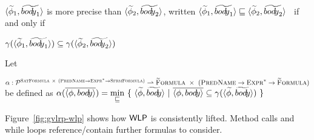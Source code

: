 \documentclass {llncs}
\begin{document}
\begin{definition}\label{def:precision-x}
    $\langle \widetilde{\phi}_1, \widetilde{bod{\!y}_1} \rangle$ is more precise than $\langle \widetilde{\phi}_2, \widetilde{bod{\!y}_2} \rangle$, written $\langle \widetilde{\phi}_1, \widetilde{bod{\!y}_1} \rangle \sqsubseteq \langle \widetilde{\phi}_2, \widetilde{bod{\!y}_2} \rangle$~ if and only if~ 
    
\noindent $\gamma(\langle \widetilde{\phi}_1, \widetilde{bod{\!y}_1} \rangle) \subseteq \gamma(\langle \widetilde{\phi}_2, \widetilde{bod{\!y}_2} \rangle)$
\end{definition}

\begin{definition}\label{def:abstraction-x}
    Let 

\noindent   $\alpha : \mathcal{P}^{\textup{\textsc{SatFormula}} ~\times~ (\textup{\textsc{PredName}} \rightarrow \textup{\textsc{Expr}}^* \rightarrow \textup{\textsc{SfrmFormula}})} \rightharpoonup \textup{\textsc{\ensuremath{\widetilde{\text{F}}}ormula}} ~\times~ (\textup{\textsc{PredName}} \rightarrow \textup{\textsc{Expr}}^* \rightarrow \textup{\textsc{\ensuremath{\widetilde{\text{F}}}ormula}})$ be defined as
    $\alpha(\overline{\langle \phi, bod{\!y} \rangle}) = \min\limits_{\sqsubseteq}~\{~ \langle \widetilde{\phi}, \widetilde{bod{\!y}} \rangle ~|~ \overline{\langle \phi, bod{\!y} \rangle} \subseteq \gamma(\langle \widetilde{\phi}, \widetilde{bod{\!y}} \rangle) ~\}$
\end{definition}


Figure~\ref{fig:gvlrp-wlp} shows how $\textup{\textmd{\textsf{WLP}}}$ is consistently lifted.
Method calls and while loops reference/contain further formulas to consider.

\end{document}
